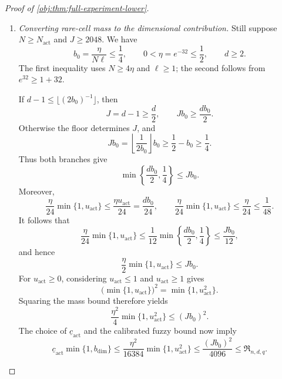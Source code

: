 \begin{proof}[Proof of \cref{obj:thm:full-experiment-lower}]
\begin{enumerate}
Define the nearer-center test
\[
\psi_{\mathrm{act}}(o)
=
\mathbf1\left\{
|b_{\mathsf T}(o)-\theta_{\mathrm{act},1}|
\le
|b_{\mathsf T}(o)-\theta_{\mathrm{act},0}|
\right\}.
\]
The triangle inequality shows that a testing error under center \(\iota\)
entails
\[
|b_{\mathsf T}(o)-\theta_{\mathrm{act},\iota}|
\ge\frac{\Delta_{\mathrm{act}}}{2}.
\]
By \cref{obj:lem:randomized-kernel-tv-comparison},
\[
Q_{\mathrm{act},0}(\psi_{\mathrm{act}}=1)
+
Q_{\mathrm{act},1}(\psi_{\mathrm{act}}=0)
\ge
1-\operatorname{TV}(Q_{\mathrm{act},0},Q_{\mathrm{act},1}).
\]
Bounding each error probability by its centered squared risk consequently
gives
\[
\frac{\Delta_{\mathrm{act}}^2}{8}
\left[
1-\operatorname{TV}(Q_{\mathrm{act},0},Q_{\mathrm{act},1})
\right]
\le
\max_{\iota\in\{0,1\}}C_{\mathrm{act},\iota}(\mathsf T).
\]
Together with the total variation and centered-risk bounds, this implies
\[
\frac{7\Delta_{\mathrm{act}}^2}{128}
-\frac{Jb_0^2}{4}
\le\mathcal W(\mathsf T).
\]
Now \(J\ge2048\) and \(\Delta_{\mathrm{act}}\ge Jb_0/12\), so
\[
\mathcal W(\mathsf T)
\ge
(Jb_0)^2
\left(\frac7{18432}-\frac1{4J}\right)
\ge\frac{(Jb_0)^2}{4096}.
\]
Taking the infimum over \(\mathsf T\) gives the calibrated fuzzy bound
\[
\frac{(Jb_0)^2}{4096}\le\mathfrak R_{n,d,q}.
\]

\item \emph{Converting rare-cell mass to the dimensional contribution.}
Still suppose \(N\ge N_{\mathrm{act}}\) and \(J\ge2048\). We have
\[
b_0=\frac{\eta}{N\ell}\le\frac14,
\qquad
0<\eta=e^{-32}\le\frac12,
\qquad d\ge2.
\]
The first inequality uses \(N\ge4\eta\) and \(\ell\ge1\); the second follows
from \(e^{32}\ge1+32\).

If \(d-1\le\lfloor(2b_0)^{-1}\rfloor\), then
\[
J=d-1\ge\frac d2,\qquad Jb_0\ge\frac{db_0}{2}.
\]
Otherwise the floor determines \(J\), and
\[
Jb_0
=\left\lfloor\frac1{2b_0}\right\rfloor b_0
\ge\frac12-b_0\ge\frac14.
\]
Thus both branches give
\[
\min\left\{\frac{db_0}{2},\frac14\right\}\le Jb_0.
\]
Moreover,
\[
\frac{\eta}{24}\min\{1,u_{\mathrm{act}}\}
\le\frac{\eta u_{\mathrm{act}}}{24}
=\frac{db_0}{24},
\qquad
\frac{\eta}{24}\min\{1,u_{\mathrm{act}}\}
\le\frac{\eta}{24}\le\frac1{48}.
\]
It follows that
\[
\frac{\eta}{24}\min\{1,u_{\mathrm{act}}\}
\le
\frac1{12}\min\left\{\frac{db_0}{2},\frac14\right\}
\le\frac{Jb_0}{12},
\]
and hence
\[
\frac{\eta}{2}\min\{1,u_{\mathrm{act}}\}\le Jb_0.
\]
For \(u_{\mathrm{act}}\ge0\), considering \(u_{\mathrm{act}}\le1\) and
\(u_{\mathrm{act}}\ge1\) gives
\[
\bigl(\min\{1,u_{\mathrm{act}}\}\bigr)^2
=\min\{1,u_{\mathrm{act}}^2\}.
\]
Squaring the mass bound therefore yields
\[
\frac{\eta^2}{4}\min\{1,u_{\mathrm{act}}^2\}
\le(Jb_0)^2.
\]
The choice of \(\underline c_{\mathrm{act}}\) and the calibrated fuzzy bound
now imply
\[
\underline c_{\mathrm{act}}\min\{1,b_{\mathrm{dim}}\}
\le
\frac{\eta^2}{16384}\min\{1,u_{\mathrm{act}}^2\}
\le\frac{(Jb_0)^2}{4096}
\le\mathfrak R_{n,d,q}.
\]


\end{enumerate}
\end{proof}
